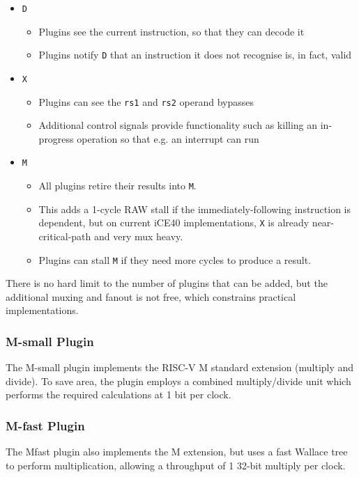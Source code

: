 \documentclass[notitlepage]{article}
\begin{document}
\begin{itemize}
	\item {\tt D}
	\begin{itemize}
		\item Plugins see the current instruction, so that they can decode it
		\item Plugins notify {\tt D} that an instruction it does not recognise is, in fact, valid
	\end{itemize}
	\item {\tt X}
	\begin{itemize}
		\item Plugins can see the {\tt rs1} and {\tt rs2} operand bypasses
		\item Additional control signals provide functionality such as killing an in-progress operation so that e.g. an interrupt can run
	\end{itemize}
	\item {\tt M}
	\begin{itemize}
		\item All plugins retire their results into {\tt M}.
		\item This adds a 1-cycle RAW stall if the immediately-following instruction is dependent, but on current iCE40 implementations, {\tt X} is already near-critical-path and very mux heavy.
		\item Plugins can stall {\tt M} if they need more cycles to produce a result.
	\end{itemize}
\end{itemize}

There is no hard limit to the number of plugins that can be added, but the additional muxing and fanout is not free, which constrains practical implementations.

\subsubsection{M-small Plugin}

The M-small plugin implements the RISC-V M standard extension (multiply and divide). To save area, the plugin employs a combined multiply/divide unit which performs the required calculations at 1 bit per clock.

\subsubsection{M-fast Plugin}

The Mfast plugin also implements the M extension, but uses a fast Wallace tree to perform multiplication, allowing a throughput of 1 32-bit multiply per clock.
\end{document}
